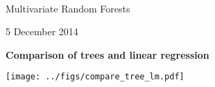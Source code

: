 \documentclass[mathserif, 11pt, t]{beamer}
\renewcommand{\subtitle}[1]{\vspace{0.45cm}\textcolor{bluegreen}{
    {\textbf{#1}}}\vspace{0.15cm}\newline}
\begin{document}
\begin{center}
\ \\ [-0.5in]
\vfill
\bigskip
\bigskip
\bigskip
\bigskip
\bigskip

\begin{LARGE}
Multivariate Random Forests
\end{LARGE}
\vfill
{}
\vfill
5 December 2014
\bigskip
\bigskip
\bigskip
\vfill
\ \\ [-0.5in]
\end{center}

\begin{frame}
\subtitle{Comparison of trees and linear regression}
\begin{center}
\texttt{[image: ../figs/compare\_tree\_lm.pdf]}
\end{center}
\end{frame}
\end{document}
